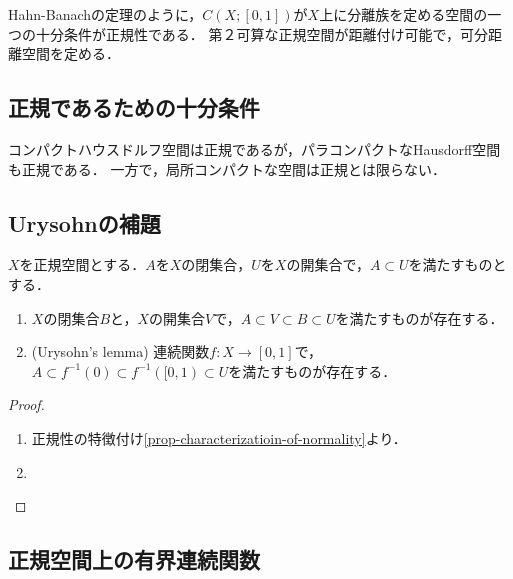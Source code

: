 \documentclass[uplatex,dvipdfmx]{jsreport}
\begin{document}
\begin{tcolorbox}[colframe=ForestGreen, colback=ForestGreen!10!white,breakable,colbacktitle=ForestGreen!40!white,coltitle=black,fonttitle=\bfseries\sffamily,
title=]
    Hahn-Banachの定理のように，$C(X;[0,1])$が$X$上に分離族を定める空間の一つの十分条件が正規性である．
    第２可算な正規空間が距離付け可能で，可分距離空間を定める．
\end{tcolorbox}

\subsection{正規であるための十分条件}

\begin{proposition}
    コンパクトハウスドルフ空間は正規であるが，パラコンパクトなHausdorff空間も正規である．
    一方で，局所コンパクトな空間は正規とは限らない．
\end{proposition}

\subsection{Urysohnの補題}

\begin{lemma}\label{lemma-Urysohn's-lemma}
    $X$を正規空間とする．$A$を$X$の閉集合，$U$を$X$の開集合で，$A\subset U$を満たすものとする．
    \begin{enumerate}
        \item $X$の閉集合$B$と，$X$の開集合$V$で，$A\subset V\subset B\subset U$を満たすものが存在する．
        \item (Urysohn's lemma) 連続関数$f:X\to[0,1]$で，$A\subset f^{-1}(0)\subset f^{-1}([0,1)\subset U$を満たすものが存在する．
    \end{enumerate}
\end{lemma}
\begin{proof}\mbox{}
    \begin{enumerate}
        \item 正規性の特徴付け\ref{prop-characterizatioin-of-normality}より．
        \item 
    \end{enumerate}
\end{proof}

\subsection{正規空間上の有界連続関数}
\end{document}
